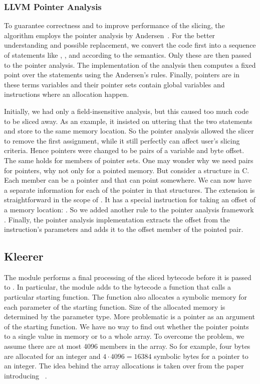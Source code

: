 \subsubsection{LLVM Pointer Analysis}
To guarantee correctness and to improve performance of the slicing, the
algorithm employs the pointer analysis by Andersen~\cite{andersen}. For the
better understanding and possible replacement, we convert the \llvm code first
into a sequence of statements like , ,
and  according to the \llvm semantics.  Only
these are then passed to the pointer analysis. The implementation of the
analysis then computes a fixed point over the statements using the Andersen's
rules. Finally, pointers are in these terms \llvm variables and their pointer
sets contain global variables and \llvm instructions where an allocation
happen.

Initially, we had only a field-insensitive analysis, but this caused too much
code to be sliced away. As an example, it insisted on uttering that the two
statements  and  store to the same memory
location. So the pointer analysis allowed the slicer to remove the first
assignment, while it still perfectly can affect user's slicing criteria. Hence
pointers were changed to be pairs of a \llvm variable and byte offset. The
same holds for members of pointer sets. One may wonder why we need pairs for
pointers, why not only for a pointed memory. But consider a structure in C.
Each member can be a pointer and that can point somewhere. We can now have a
separate information for each of the pointer in that structures. The extension
is straightforward in the scope of \llvm. It has a special instruction for
taking an offset of a memory location: . So we added
another rule to the pointer analysis framework . Finally,
the pointer analysis implementation extracts the offset from the instruction's
parameters and adds it to the offset member of the pointed pair.

\subsection{Kleerer}
The module  performs a final processing of the sliced bytecode
before it is passed to \klee. In particular, the module adds to the bytecode a
function  that calls a particular starting function.  The
 function also allocates a symbolic memory for each parameter of
the starting function. Size of the allocated memory is determined by the
parameter type.  More problematic is a pointer as an argument of the starting
function. We have no way to find out whether the pointer points to a single
value in memory or to a whole array. To overcome the problem, we assume there
are at most 4096 members in the array. So for example, four bytes are
allocated for an integer and $4\cdot4096=16384$ symbolic bytes for a pointer
to an integer. The idea behind the array allocations is taken over from the
paper introducing \ucklee~\cite{ucklee}.

